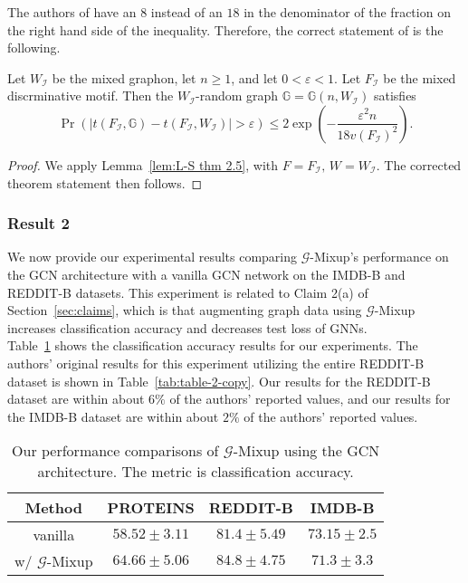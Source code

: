The authors of \cite{Han:2022} have an $8$ instead of an $18$ in the denominator of the fraction on the right hand side of the inequality. Therefore, the correct statement of \cite[Theorem 4.3]{Han:2022} is the following.

\begin{theorem}\label{thm:4.3}
Let $W_{\mathcal{I}}$ be the mixed graphon, let $n\geq 1$, and let $0 < \varepsilon < 1$. Let $F_{\mathcal{I}}$ be the mixed discrminative motif. Then the $W_{\mathcal{I}}$-random graph $\mathbb{G}=\mathbb{G}(n,W_{\mathcal{I}})$ satisfies
\[\Pr(|t(F_{\mathcal{I}},\mathbb{G})-t(F_{\mathcal{I}},W_{\mathcal{I}})|>\varepsilon)\leq 2\exp\left(-\frac{\varepsilon^2n}{18 v(F_\mathcal{I})^2}\right).\]
\end{theorem}

\begin{proof}
We apply Lemma~\ref{lem:L-S thm 2.5}, with $F=F_{\mathcal{I}},\, W=W_{\mathcal{I}}.$
The corrected theorem statement then follows.
\end{proof}



\subsubsection{Result 2}\label{section:gen-result}

We now provide our experimental results comparing $\mathcal{G}$-Mixup's performance on the GCN architecture with a vanilla GCN network on the IMDB-B and REDDIT-B datasets. This experiment is related to Claim 2(a) of Section~\ref{sec:claims}, which is that augmenting graph data using $\mathcal{G}$-Mixup increases classification accuracy and decreases test loss of GNNs.
\\

Table~\ref{tab:our-table-2} shows the classification accuracy results for our experiments. The authors' original results for this experiment utilizing the entire REDDIT-B dataset is shown in Table~\ref{tab:table-2-copy}. Our results for the REDDIT-B dataset are within about $6\%$ of the authors' reported values, and our results for the IMDB-B dataset are within about $2\%$ of the authors' reported values.

\begin{table}[h]
    \centering
    \begin{tabular}{c|ccc}
        Method & PROTEINS & REDDIT-B & IMDB-B\\
        \hline
        vanilla & $58.52 \pm 3.11$ & $81.4 \pm 5.49$ & $\mathbf{73.15 \pm 2.5}$ \\
        w/ $\mathcal{G}$-Mixup & $\mathbf{64.66 \pm 5.06}$ & $\mathbf{84.8 \pm 4.75}$ & $71.3 \pm 3.3$
    \end{tabular}
    \caption{Our performance comparisons of $\mathcal{G}$-Mixup using the GCN architecture. The metric is classification accuracy.}
    \label{tab:our-table-2}
\end{table}

